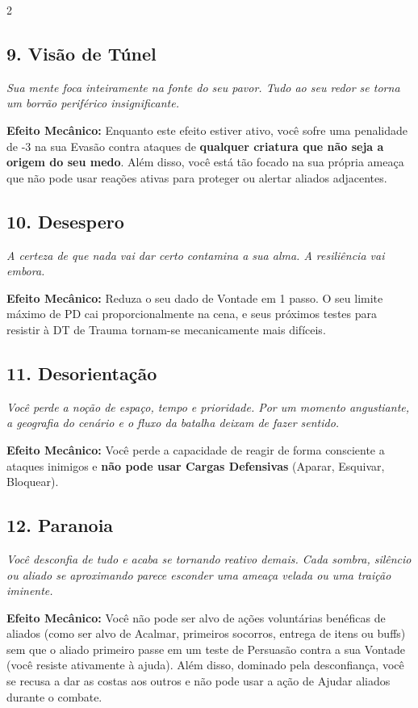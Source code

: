 \documentclass[a4paper,11pt,openany]{book}
\begin{document}
\begin{multicols}{2}
\subsection*{9. Visão de Túnel}
\textit{Sua mente foca inteiramente na fonte do seu pavor. Tudo ao seu redor se torna um borrão periférico insignificante.}

\textbf{Efeito Mecânico:} Enquanto este efeito estiver ativo, você sofre uma penalidade de -3 na sua Evasão contra ataques de \textbf{qualquer criatura que não seja a origem do seu medo}. Além disso, você está tão focado na sua própria ameaça que não pode usar reações ativas para proteger ou alertar aliados adjacentes.

\subsection*{10. Desespero}
\textit{A certeza de que nada vai dar certo contamina a sua alma. A resiliência vai embora.}

\textbf{Efeito Mecânico:} Reduza o seu dado de Vontade em 1 passo. O seu limite máximo de PD cai proporcionalmente na cena, e seus próximos testes para resistir à DT de Trauma tornam-se mecanicamente mais difíceis.

\subsection*{11. Desorientação}
\textit{Você perde a noção de espaço, tempo e prioridade. Por um momento angustiante, a geografia do cenário e o fluxo da batalha deixam de fazer sentido.}

\textbf{Efeito Mecânico:} Você perde a capacidade de reagir de forma consciente a ataques inimigos e \textbf{não pode usar Cargas Defensivas} (Aparar, Esquivar, Bloquear). 

\subsection*{12. Paranoia}
\textit{Você desconfia de tudo e acaba se tornando reativo demais. Cada sombra, silêncio ou aliado se aproximando parece esconder uma ameaça velada ou uma traição iminente.}

\textbf{Efeito Mecânico:} Você não pode ser alvo de ações voluntárias benéficas de aliados (como ser alvo de Acalmar, primeiros socorros, entrega de itens ou buffs) sem que o aliado primeiro passe em um teste de Persuasão contra a sua Vontade (você resiste ativamente à ajuda). Além disso, dominado pela desconfiança, você se recusa a dar as costas aos outros e não pode usar a ação de Ajudar aliados durante o combate.


\end{multicols}
\end{document}
